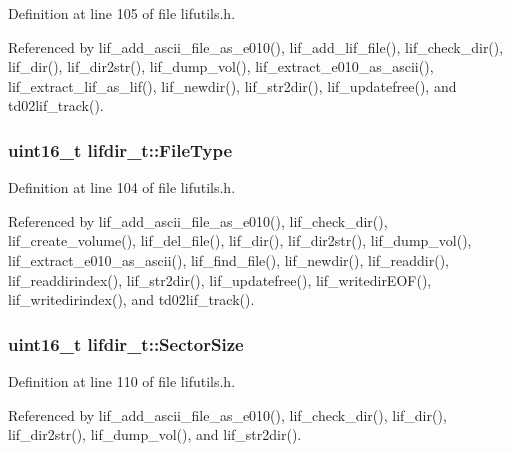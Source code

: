 Definition at line 105 of file lifutils.\+h.



Referenced by lif\+\_\+add\+\_\+ascii\+\_\+file\+\_\+as\+\_\+e010(), lif\+\_\+add\+\_\+lif\+\_\+file(), lif\+\_\+check\+\_\+dir(), lif\+\_\+dir(), lif\+\_\+dir2str(), lif\+\_\+dump\+\_\+vol(), lif\+\_\+extract\+\_\+e010\+\_\+as\+\_\+ascii(), lif\+\_\+extract\+\_\+lif\+\_\+as\+\_\+lif(), lif\+\_\+newdir(), lif\+\_\+str2dir(), lif\+\_\+updatefree(), and td02lif\+\_\+track().

\subsubsection[{\texorpdfstring{File\+Type}{FileType}}]{\setlength{\rightskip}{0pt plus 5cm}uint16\+\_\+t lifdir\+\_\+t\+::\+File\+Type}\hypertarget{structlifdir__t_a7a93a706ac4bb88f65826619c9b02231}{}\label{structlifdir__t_a7a93a706ac4bb88f65826619c9b02231}


Definition at line 104 of file lifutils.\+h.



Referenced by lif\+\_\+add\+\_\+ascii\+\_\+file\+\_\+as\+\_\+e010(), lif\+\_\+check\+\_\+dir(), lif\+\_\+create\+\_\+volume(), lif\+\_\+del\+\_\+file(), lif\+\_\+dir(), lif\+\_\+dir2str(), lif\+\_\+dump\+\_\+vol(), lif\+\_\+extract\+\_\+e010\+\_\+as\+\_\+ascii(), lif\+\_\+find\+\_\+file(), lif\+\_\+newdir(), lif\+\_\+readdir(), lif\+\_\+readdirindex(), lif\+\_\+str2dir(), lif\+\_\+updatefree(), lif\+\_\+writedir\+E\+O\+F(), lif\+\_\+writedirindex(), and td02lif\+\_\+track().

\subsubsection[{\texorpdfstring{Sector\+Size}{SectorSize}}]{\setlength{\rightskip}{0pt plus 5cm}uint16\+\_\+t lifdir\+\_\+t\+::\+Sector\+Size}\hypertarget{structlifdir__t_adf3c38eecddce15925157383ff38ef2d}{}\label{structlifdir__t_adf3c38eecddce15925157383ff38ef2d}


Definition at line 110 of file lifutils.\+h.



Referenced by lif\+\_\+add\+\_\+ascii\+\_\+file\+\_\+as\+\_\+e010(), lif\+\_\+check\+\_\+dir(), lif\+\_\+dir(), lif\+\_\+dir2str(), lif\+\_\+dump\+\_\+vol(), and lif\+\_\+str2dir().

